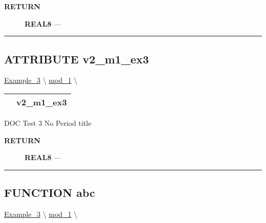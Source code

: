 \par
\begin{description}
\item [\colorbox{tagtype}{\color{white} \textbf{\textsf{RETURN}}}] \textbf{REAL8} --- 
\end{description}




\rule{\linewidth}{0.5pt}
\subsection*{\textsf{\colorbox{headtoc}{\color{white} ATTRIBUTE}
v2\_m1\_ex3}}

\hypertarget{ecldoc:example_3.mod_1.v2_m1_ex3}{}
\hspace{0pt} \hyperlink{ecldoc:Example_3}{Example_3} \textbackslash 
\hspace{0pt} \hyperlink{ecldoc:Example_3.mod_1}{mod_1} \textbackslash 

{\renewcommand{\arraystretch}{1.5}
\begin{tabularx}{\textwidth}{|>{\raggedright\arraybackslash}l|X|}
\hline
\hspace{0pt}\mytexttt{\color{red} } & \textbf{v2\_m1\_ex3} \\
\hline
\end{tabularx}
}

\par





DOC Test 3 No Period title








\par
\begin{description}
\item [\colorbox{tagtype}{\color{white} \textbf{\textsf{RETURN}}}] \textbf{REAL8} --- 
\end{description}




\rule{\linewidth}{0.5pt}
\subsection*{\textsf{\colorbox{headtoc}{\color{white} FUNCTION}
abc}}

\hypertarget{ecldoc:example_3.mod_1.abc}{}
\hspace{0pt} \hyperlink{ecldoc:Example_3}{Example_3} \textbackslash 
\hspace{0pt} \hyperlink{ecldoc:Example_3.mod_1}{mod_1} \textbackslash 

